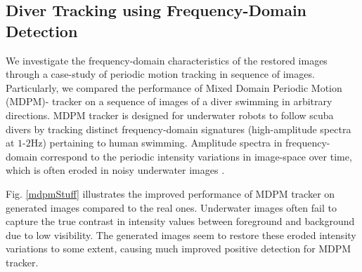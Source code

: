 \documentclass[letterpaper, 10pt, conference]{ieeeconf}
\begin{document}
\subsection{Diver Tracking using Frequency-Domain Detection}
We investigate the frequency-domain characteristics of the restored images through a case-study of periodic motion tracking in sequence of images. Particularly, we compared the performance of Mixed Domain Periodic Motion (MDPM)- tracker \cite{islam2017mixed} on a sequence of images of a diver swimming in  arbitrary directions. MDPM tracker is designed for underwater robots to follow scuba divers by   tracking distinct frequency-domain signatures (high-amplitude spectra at $1$-$2$Hz) pertaining to human swimming. Amplitude spectra in frequency-domain correspond to the periodic intensity variations in image-space over time, which is often eroded in noisy underwater images \cite{shkurti2017underwater}.

Fig. \ref{mdpmStuff} illustrates the improved performance of MDPM tracker on generated images compared to the real ones. Underwater images often fail to capture the true contrast in intensity values between foreground and background due to low visibility. The generated images seem to restore these eroded intensity variations to some extent, causing much improved positive detection for MDPM tracker.
\end{document}
